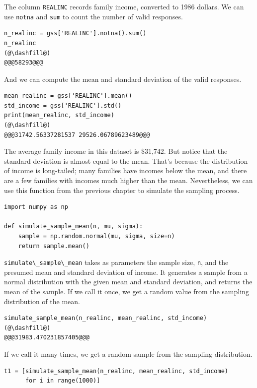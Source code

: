 The column \passthrough{\lstinline!REALINC!} records family income,
converted to 1986 dollars. We can use \passthrough{\lstinline!notna!}
and \passthrough{\lstinline!sum!} to count the number of valid
responses.

\begin{lstlisting}[]
n_realinc = gss['REALINC'].notna().sum()
n_realinc
(@\dashfill@)
@@@58293@@@
\end{lstlisting}

And we can compute the mean and standard deviation of the valid
responses.

\begin{lstlisting}[]
mean_realinc = gss['REALINC'].mean()
std_income = gss['REALINC'].std()
print(mean_realinc, std_income)
(@\dashfill@)
@@@31742.56337281537 29526.06789623489@@@
\end{lstlisting}

The average family income in this dataset is \$31,742. But notice that
the standard deviation is almost equal to the mean. That's because the
distribution of income is long-tailed; many families have incomes below
the mean, and there are a few families with incomes much higher than the
mean. Nevertheless, we can use this function from the previous chapter
to simulate the sampling process.

\begin{lstlisting}[]
import numpy as np

def simulate_sample_mean(n, mu, sigma):
    sample = np.random.normal(mu, sigma, size=n)
    return sample.mean()
\end{lstlisting}

\passthrough{\lstinline!simulate\_sample\_mean!} takes as parameters the
sample size, \passthrough{\lstinline!n!}, and the presumed mean and
standard deviation of income. It generates a sample from a normal
distribution with the given mean and standard deviation, and returns the
mean of the sample. If we call it once, we get a random value from the
sampling distribution of the mean.

\begin{lstlisting}[]
simulate_sample_mean(n_realinc, mean_realinc, std_income)
(@\dashfill@)
@@@31983.470231857405@@@
\end{lstlisting}

If we call it many times, we get a random sample from the sampling
distribution.

\begin{lstlisting}[]
t1 = [simulate_sample_mean(n_realinc, mean_realinc, std_income)
      for i in range(1000)]
\end{lstlisting}

